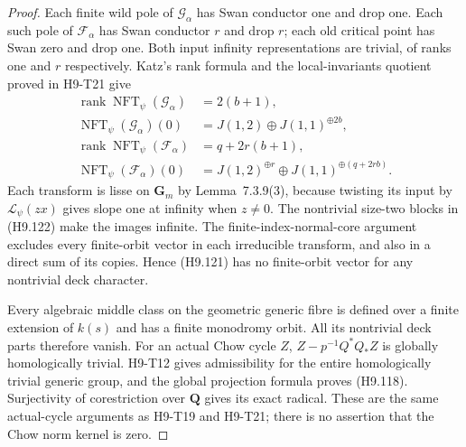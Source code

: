 \begin{proof}
Each finite wild pole of $\mathcal G_\alpha$ has
Swan conductor one and drop one. Each such pole
of $\mathcal F_\alpha$ has Swan conductor $r$ and
drop $r$; each old critical point has Swan zero
and drop one. Both input infinity representations
are trivial, of ranks one and $r$ respectively.
Katz's rank formula and the local-invariants
quotient proved in H9-T21 give
\[
 \begin{split}
 \operatorname{rank}\operatorname{NFT}_\psi(\mathcal G_\alpha)
       &=2(b+1),\\
 \operatorname{NFT}_\psi(\mathcal G_\alpha)(0)
       &=J(1,2)\oplus J(1,1)^{\oplus2b},\\
 \operatorname{rank}\operatorname{NFT}_\psi(\mathcal F_\alpha)
       &=q+2r(b+1),\\
 \operatorname{NFT}_\psi(\mathcal F_\alpha)(0)
       &=J(1,2)^{\oplus r}
                      \oplus J(1,1)^{\oplus(q+2rb)}.
 \end{split}                                                  \tag{H9.122}
\]
Each transform is lisse on $\mathbf G_m$ by
Lemma~7.3.9(3), because twisting its input by
$\mathcal L_\psi(zx)$ gives slope one at infinity
when $z\ne0$. The nontrivial size-two blocks in
(H9.122) make the images infinite. The
finite-index-normal-core argument excludes every
finite-orbit vector in each irreducible transform,
and also in a direct sum of its copies. Hence
(H9.121) has no finite-orbit vector for any
nontrivial deck character.

Every algebraic middle class on the geometric
generic fibre is defined over a finite extension
of $k(s)$ and has a finite monodromy orbit.
All its nontrivial deck parts therefore vanish.
For an actual Chow cycle $Z$,
$Z-p^{-1}Q^*Q_*Z$ is globally homologically
trivial. H9-T12 gives admissibility for the entire
homologically trivial generic group, and the
global projection formula proves (H9.118).
Surjectivity of corestriction over $\mathbf Q$
gives its exact radical. These are the same
actual-cycle arguments as H9-T19 and H9-T21;
there is no assertion that the Chow norm kernel
is zero.


\end{proof}
